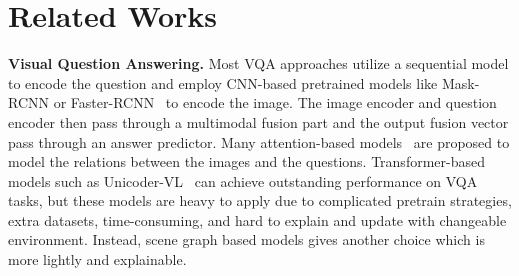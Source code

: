 \documentclass[letterpaper]{article} %
\begin{document}
\section{Related Works}
\noindent\textbf{Visual Question Answering.}
Most VQA approaches utilize a sequential model to encode the question and employ CNN-based pretrained models like Mask-RCNN or Faster-RCNN~\cite{DBLP:conf/cvpr/FanZ18,DBLP:conf/cvpr/PatroN18,DBLP:conf/cvpr/NamHK17} to encode the image.
The image encoder and question encoder then pass through a multimodal fusion part and the output fusion vector pass through an answer predictor.
Many attention-based models~\cite{DBLP:conf/cvpr/00010BT0GZ18,DBLP:conf/cvpr/YangHGDS16,DBLP:conf/eccv/XuS16,DBLP:conf/nips/LuYBP16,DBLP:conf/iclr/HudsonM18} are proposed to model the relations between the images and the questions.
Transformer-based models such as Unicoder-VL~\cite{DBLP:conf/aaai/LiDFGJ20} can achieve outstanding performance on VQA tasks, but these models are heavy to apply due to complicated pretrain strategies, extra datasets, time-consuming, and hard to explain and update with changeable environment. Instead, scene graph based models gives another choice which is more lightly and explainable.
\end{document}
